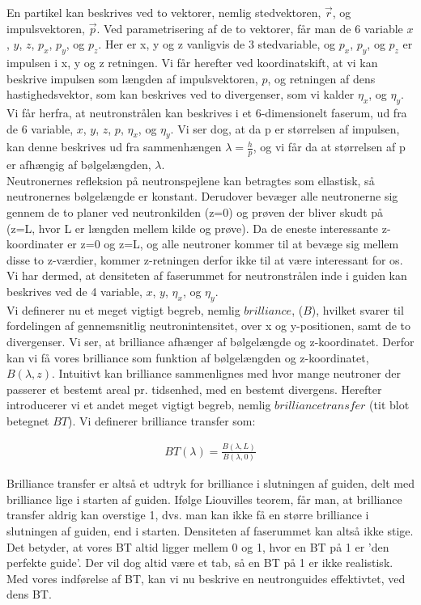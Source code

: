 \documentclass[12pt,oneside,a4paper]{article}
\begin{document}
{{{{{En partikel kan beskrives ved to vektorer, nemlig stedvektoren, $\vec{r}$, og impulsvektoren, $\vec{p}$. Ved parametrisering af de to vektorer, får man de 6 variable $x$, $y$, $z$, $p_x$, $p_y$, og $p_z$. Her er x, y og z vanligvis de 3 stedvariable, og $p_x$, $p_y$, og $p_z$ er impulsen i x, y og z retningen. Vi får herefter ved koordinatskift, at vi kan beskrive impulsen som længden af impulsvektoren, $p$, og retningen af dens hastighedsvektor, som kan beskrives ved to divergenser, som vi kalder $\eta_x$, og $\eta_y$.
Vi får herfra, at neutronstrålen kan beskrives i et 6-dimensionelt faserum, ud fra de 6 variable, $x$, $y$, $z$, $p$, $\eta_x$, og $\eta_y$. Vi ser dog, at da p er størrelsen af impulsen, kan denne  beskrives ud fra sammenhængen $\lambda=\frac{h}{p}$, og vi får da at størrelsen af p er afhængig af bølgelængden, $\lambda$. 
\\ 

Neutronernes refleksion på neutronspejlene kan betragtes som ellastisk, så neutronernes bølgelængde er konstant. Derudover bevæger alle neutronerne sig gennem de to planer ved neutronkilden (z=0) og prøven der bliver skudt på (z=L, hvor L er længden mellem kilde og prøve). Da de eneste interessante z-koordinater er z=0 og z=L, og alle neutroner kommer til at bevæge sig mellem disse to z-værdier, kommer z-retningen derfor ikke til at være interessant for os. Vi har dermed, at densiteten af faserummet for neutronstrålen inde i guiden kan beskrives ved de 4 variable,  $x$, $y$, $\eta_x$, og $\eta_y$. 
\\


Vi definerer nu et meget vigtigt begreb, nemlig $brilliance$, ($B$), hvilket svarer til fordelingen af gennemsnitlig neutronintensitet, over x og y-positionen, samt de to divergenser. Vi ser, at brilliance afhænger af bølgelængde og z-koordinatet. Derfor kan vi få vores brilliance som funktion af bølgelængden og z-koordinatet, $B(\lambda,z)$. Intuitivt kan brilliance sammenlignes med hvor mange neutroner der passerer et bestemt areal pr. tidsenhed, med en bestemt divergens. Herefter introducerer vi et andet meget vigtigt begreb, nemlig $brilliance transfer$ (tit blot betegnet $BT$). Vi definerer brilliance transfer som:

\begin{align}
BT(\lambda)=\frac{B(\lambda, L)}{B(\lambda,0)}
\end{align}

Brilliance transfer er altså et udtryk for brilliance i slutningen af guiden, delt med brilliance lige i starten af guiden. Ifølge Liouvilles teorem,\cite{Kaspar_PhD} får man, at brilliance transfer aldrig kan overstige 1, dvs. man kan ikke få en større brilliance i slutningen af guiden, end i starten. Densiteten af faserummet kan altså ikke stige. Det betyder, at vores BT altid ligger mellem 0 og 1, hvor en BT på 1 er 'den perfekte guide'. Der vil dog altid være et tab, så en BT på 1 er ikke realistisk. Med vores indførelse af BT, kan vi nu beskrive en neutronguides effektivtet, ved dens BT. \cite{report:ess_optimizations}


}}}}}
\end{document}
